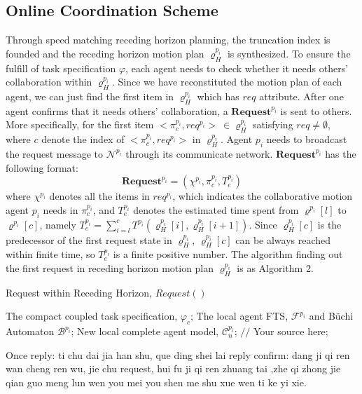 \documentclass[journal]{IEEEtran}
\begin{document}
\subsection{Online Coordination Scheme}
Through speed matching receding horizon planning, the truncation index is founded and the receding horizon motion plan $\varrho^{p_i}_H$ is synthesized. To ensure the fulfill of task specification $\varphi$, each agent needs to check whether it needs others' collaboration within $\varrho^{p_i}_H$. Since we have reconstituted the motion plan of each agent, we can just find the first item in $\varrho^{p_i}_H$ which has $req$ attribute.  After one agent confirms that it needs others' collaboration, a $\textbf{Request}^{p_i}$ is sent to others. More specifically, for the first item $<\pi_c^{p_i},req^{p_i}>\ \in \varrho^{p_i}_H$ satisfying $req \neq \emptyset$, where $c$ denote the index of $<\pi_c^{p_i},req^{p_i}>$ in $\varrho^{p_i}_H$. Agent $p_i$ needs to broadcast the request message to $\mathcal{N}^{p_i}$ through its communicate network. $\textbf{Request}^{p_i}$ has the following format:
$$\textbf{Request}^{p_i} = (\chi^{p_i},\pi_c^{p_i},T^{p_i}_e)$$
where $\chi^{p_i}$ denotes all the items in $req^{p_i}$, which indicates the collaborative motion agent $p_i$ needs in $\pi_c^{p_i}$, and $T^{p_i}_e$ denotes the estimated time spent from $\varrho^{p_i}[l]$ to $\varrho^{p_i}[c]$, namely $T^{p_i}_e=\sum_{i=l}^{c}T^{p_i}(\varrho^{p_i}_H[i],\varrho^{p_i}_H[i+1])$. Since $\varrho^{p_i}_H[c]$ is the predecessor of the first request state in $\varrho^{p_i}_H$, $\varrho^{p_i}_H[c]$ can be always reached within finite time, so $T^{p_i}_e$ is a finite positive number.
The algorithm finding out the first request in receding horizon motion plan $\varrho^{p_i}_H$ is as Algorithm 2.\par
\begin{algorithm}[hb]
  \caption{ Request within Receding Horizon, $Request()$ }
  \label{alg:Framwork}
  \begin{algorithmic}[1]
    \Require
      The compact coupled task specification, $\varphi_c$;
      The local agent FTS, $\mathcal{F}^{p_i}$ and B\"{u}chi Automaton $\mathcal{B}^{p_i}$;
    \Ensure
      New local complete agent model, $\mathcal{C}^{p_i}_n$;
          \State $//$ Your source here;
        \EndFor
  \end{algorithmic}
\end{algorithm}
Once 
reply: ti chu dai jia han shu, que ding shei lai reply
confirm: dang ji qi ren wan cheng ren wu, jie chu request, hui fu ji qi ren zhuang tai ,zhe qi zhong jie qian guo meng lun wen you mei you shen me shu xue wen ti ke yi xie.
\end{document}
